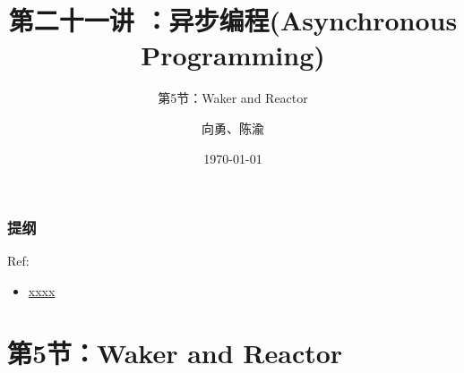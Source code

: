 


\title[第21讲]{第二十一讲 ：异步编程(Asynchronous Programming)} %
\subtitle{第5节：Waker and Reactor}
\author{向勇、陈渝} %
\date{\today} %



\begin{frame}
\titlepage %
\end{frame}

\begin{frame}
\frametitle{提纲} %
\tableofcontents %

Ref:
    \begin{itemize}
        \item \href{}{xxxx}
    \end{itemize}

\end{frame}
\section{第5节：Waker and Reactor} %
